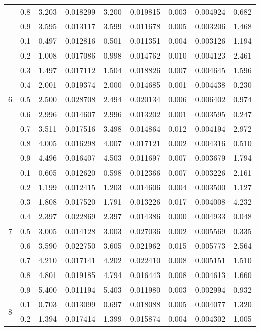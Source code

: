 \begin{longtable}{ | c | c || c | c | c | c | c | c | c | }
 & 0.8 & 3.203 & 0.018299 & 3.200 & 0.019815 & 0.003 & 0.004924 & 0.682 \\
 & 0.9 & 3.595 & 0.013117 & 3.599 & 0.011678 & 0.005 & 0.003206 & 1.468 \\
 \hline
\multirow{9}{*}{6} & 0.1 & 0.497 & 0.012816 & 0.501 & 0.011351 & 0.004 & 0.003126 & 1.194 \\
 & 0.2 & 1.008 & 0.017086 & 0.998 & 0.014762 & 0.010 & 0.004123 & 2.461 \\
 & 0.3 & 1.497 & 0.017112 & 1.504 & 0.018826 & 0.007 & 0.004645 & 1.596 \\
 & 0.4 & 2.001 & 0.019374 & 2.000 & 0.014685 & 0.001 & 0.004438 & 0.230 \\
 & 0.5 & 2.500 & 0.028708 & 2.494 & 0.020134 & 0.006 & 0.006402 & 0.974 \\
 & 0.6 & 2.996 & 0.014607 & 2.996 & 0.013202 & 0.001 & 0.003595 & 0.247 \\
 & 0.7 & 3.511 & 0.017516 & 3.498 & 0.014864 & 0.012 & 0.004194 & 2.972 \\
 & 0.8 & 4.005 & 0.016298 & 4.007 & 0.017121 & 0.002 & 0.004316 & 0.510 \\
 & 0.9 & 4.496 & 0.016407 & 4.503 & 0.011697 & 0.007 & 0.003679 & 1.794 \\
 \hline
\multirow{9}{*}{7} & 0.1 & 0.605 & 0.012620 & 0.598 & 0.012366 & 0.007 & 0.003226 & 2.161 \\
 & 0.2 & 1.199 & 0.012415 & 1.203 & 0.014606 & 0.004 & 0.003500 & 1.127 \\
 & 0.3 & 1.808 & 0.017520 & 1.791 & 0.013226 & 0.017 & 0.004008 & 4.232 \\
 & 0.4 & 2.397 & 0.022869 & 2.397 & 0.014386 & 0.000 & 0.004933 & 0.048 \\
 & 0.5 & 3.005 & 0.014128 & 3.003 & 0.027036 & 0.002 & 0.005569 & 0.335 \\
 & 0.6 & 3.590 & 0.022750 & 3.605 & 0.021962 & 0.015 & 0.005773 & 2.564 \\
 & 0.7 & 4.210 & 0.017141 & 4.202 & 0.022410 & 0.008 & 0.005151 & 1.510 \\
 & 0.8 & 4.801 & 0.019185 & 4.794 & 0.016443 & 0.008 & 0.004613 & 1.660 \\
 & 0.9 & 5.400 & 0.011194 & 5.403 & 0.011980 & 0.003 & 0.002994 & 0.932 \\
 \hline
\multirow{9}{*}{8} & 0.1 & 0.703 & 0.013099 & 0.697 & 0.018088 & 0.005 & 0.004077 & 1.320 \\
 & 0.2 & 1.394 & 0.017414 & 1.399 & 0.015874 & 0.004 & 0.004302 & 1.005 \\

\end{longtable}
